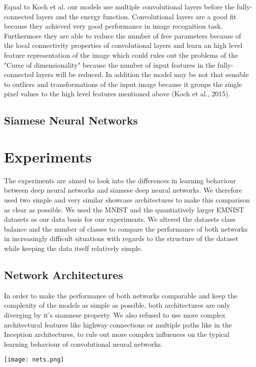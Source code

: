 \documentclass[a4paper,pt12]{article}
\begin{document}
Equal to Koch et al. our models use multiple convolutional layers before the fully-connected layers and the energy function. Convolutional layers are a good fit because they achieved very good performance in image recognition task. Furthermore they are able to reduce the number of free parameters because of the local connectivity properties of convolutional layers and learn an high level feature representation of the image which could rules out the problems of the "Curse of dimensionality" because the number of input features in the fully-connected layers will be reduced. In addition the model may be not that sensible to outliers and transformations of the input image because it groups the single pixel values to the high level features mentioned above (Koch et al., 2015).

\subsection{Siamese Neural Networks}

\section{Experiments}
The experiments are aimed to look into the differences in learning behaviour between deep neural networks and siamese deep neural networks. We therefore used two simple and very similar showcase  architectures to make this comparison as clear as possible. We used the MNIST and the quantiatively larger EMNIST datasets as our data basis for our experiments. We altered the datasets class balance and the number of classes to compare the performance of both networks in increasingly difficult situations with regards to the structure of the dataset while keeping the data itself relatively simple.  

\subsection{Network Architectures}
In order to make the performance of both networks comparable and keep the complexity of the models as simple as possible, both architectures are only diverging by it's siamnese property. We also refused to use more complex architectural features like highway connections or multiple paths like in the Inception architectures, to rule out more complex influences on the typical learning behaviour of convolutional neural networks.

\texttt{[image: nets.png]}
\end{document}
